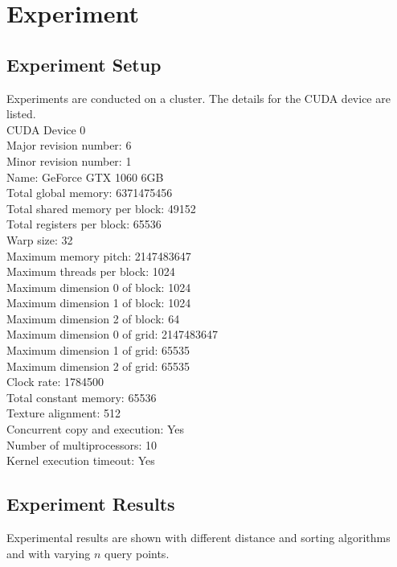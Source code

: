 \section{Experiment} 
\subsection{Experiment Setup}
Experiments are conducted on a cluster. The details for the CUDA device are listed.\\
CUDA Device 0\\
Major revision number:         6\\
Minor revision number:         1\\
Name:                          GeForce GTX 1060 6GB \\ 
Total global memory:           6371475456 \\
Total shared memory per block: 49152 \\
Total registers per block:     65536 \\
Warp size:                     32 \\ 
Maximum memory pitch:          2147483647 \\
Maximum threads per block:     1024 \\
Maximum dimension 0 of block:  1024 \\
Maximum dimension 1 of block:  1024 \\
Maximum dimension 2 of block:  64 \\
Maximum dimension 0 of grid:   2147483647 \\
Maximum dimension 1 of grid:   65535 \\
Maximum dimension 2 of grid:   65535 \\
Clock rate:                    1784500 \\
Total constant memory:         65536 \\
Texture alignment:             512 \\
Concurrent copy and execution: Yes \\
Number of multiprocessors:     10 \\
Kernel execution timeout:      Yes \\

\subsection{Experiment Results}
Experimental results are shown with different distance and sorting algorithms and with varying $n$ query points.

